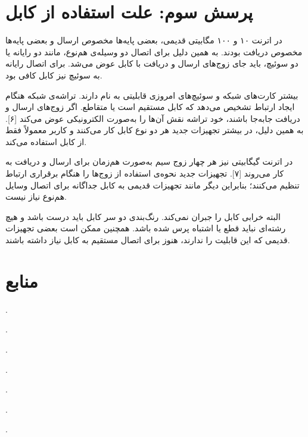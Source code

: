 \section{پرسش سوم: علت استفاده از کابل }

در اترنت ۱۰ و ۱۰۰ مگابیتی قدیمی، بعضی پایه‌ها مخصوص ارسال و بعضی پایه‌ها مخصوص دریافت بودند.
به همین دلیل برای اتصال دو وسیله‌ی هم‌نوع، مانند دو رایانه یا دو سوئیچ، باید جای زوج‌های ارسال و دریافت با کابل  عوض می‌شد.
برای اتصال رایانه به سوئیچ نیز کابل  کافی بود.

بیشتر کارت‌های شبکه و سوئیچ‌های امروزی قابلیتی به نام  دارند.
تراشه‌ی شبکه هنگام ایجاد ارتباط تشخیص می‌دهد که کابل مستقیم است یا متقاطع.
اگر زوج‌های ارسال و دریافت جابه‌جا باشند، خود تراشه نقش آن‌ها را به‌صورت الکترونیکی عوض می‌کند [۶].
به همین دلیل، در بیشتر تجهیزات جدید هر دو نوع کابل کار می‌کنند و کاربر معمولاً فقط از کابل  استفاده می‌کند.

در اترنت گیگابیتی نیز هر چهار زوج سیم به‌صورت هم‌زمان برای ارسال و دریافت به کار می‌روند [۷].
تجهیزات جدید نحوه‌ی استفاده از زوج‌ها را هنگام برقراری ارتباط تنظیم می‌کنند؛
بنابراین دیگر مانند تجهیزات قدیمی به کابل جداگانه برای اتصال وسایل هم‌نوع نیاز نیست.

البته  خرابی کابل را جبران نمی‌کند.
رنگ‌بندی دو سر کابل باید درست باشد و هیچ رشته‌ای نباید قطع یا اشتباه پرس شده باشد.
همچنین ممکن است بعضی تجهیزات قدیمی که این قابلیت را ندارند، هنوز برای اتصال مستقیم به کابل  نیاز داشته باشند.

\section{منابع}


\href{https://www.ieee802.org/misc-docs/GlobeCom2009/IEEE_802d3_Law.pdf}{}.

\href{https://www.cisco.com/c/en/us/td/docs/sanity/suman/CPwE-Physical-Infrastructure_Feb2023.html}{}.

\href{https://www.itu.int/rec/T-REC-G.652-202408-I/en}{}.

\href{https://www.rfc-editor.org/rfc/rfc1122.html}{}.

\href{https://www.iso.org/standard/20269.html}{}.

\href{https://www.ti.com/lit/ds/symlink/dp83826ai.pdf}{}.

\href{https://www.ieee802.org/3/minutes/july98/E2_0798.pdf}{}.

